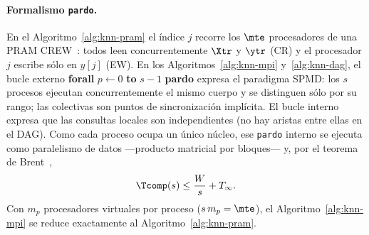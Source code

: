 \begin{algorithm}[H]
\caption{KNN distribuido con MPI: replicación de $X_{\text{tr}}$, partición de $X_{\text{te}}$}\label{alg:knn-mpi}
\BlankLine
{}
\end{algorithm}

\paragraph{Formalismo \texttt{pardo}.}
En el Algoritmo~\ref{alg:knn-pram} el índice $j$ recorre los $\mte$ procesadores de una PRAM
CREW~\cite{jaja1992}: todos leen concurrentemente $\Xtr$ y $\ytr$ (CR) y el procesador $j$ escribe
sólo en $\hat{y}[j]$ (EW). En los Algoritmos~\ref{alg:knn-mpi} y~\ref{alg:knn-dag}, el bucle
externo \textbf{forall} $p\leftarrow 0$ \textbf{to} $s-1$ \textbf{pardo} expresa el paradigma
SPMD: los $s$ procesos ejecutan concurrentemente el mismo cuerpo y se distinguen sólo por su rango;
las colectivas son puntos de sincronización implícita. El bucle interno expresa que las consultas
locales son independientes (no hay aristas entre ellas en el DAG). Como cada proceso ocupa un único
núcleo, ese \texttt{pardo} interno se ejecuta como paralelismo de datos ---producto matricial por
bloques--- y, por el teorema de Brent~\cite{brent1974},
\begin{equation}
  \Tcomp(s)\le\frac{W}{s}+T_\infty .\label{eq:brent}
\end{equation}
Con $m_p$ procesadores virtuales por proceso ($s\,m_p=\mte$), el Algoritmo~\ref{alg:knn-mpi} se
reduce exactamente al Algoritmo~\ref{alg:knn-pram}.


